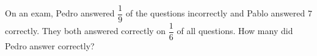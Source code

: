 On an exam, Pedro answered $\dfrac{1}{9}$ of the questions incorrectly and Pablo answered $7$ correctly. They both answered correctly on $\dfrac{1}{6}$ of all questions. How many did Pedro answer correctly?
